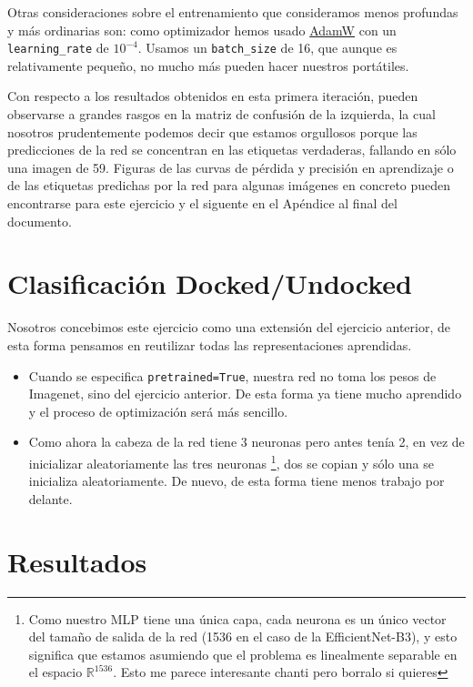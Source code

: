 \documentclass{article}
\begin{document}
Otras consideraciones sobre el entrenamiento que consideramos menos profundas y más ordinarias son: como optimizador hemos usado \href{https://arxiv.org/pdf/1711.05101}{AdamW} con un \texttt{learning\_rate} de $10^{-4}$. Usamos un \texttt{batch\_size} de 16, que aunque es relativamente pequeño, no mucho más pueden hacer nuestros portátiles. 

Con respecto a los resultados obtenidos en esta primera iteración, pueden observarse a grandes rasgos en la matriz de confusión de la izquierda, la cual nosotros prudentemente podemos decir que estamos orgullosos porque las predicciones de la red se concentran en las etiquetas verdaderas, fallando en sólo una imagen de 59. Figuras de las curvas de pérdida y precisión en aprendizaje o de las etiquetas predichas por la red para algunas imágenes en concreto pueden encontrarse para este ejercicio y el siguente en el Apéndice al final del documento.


\section*{Clasificación Docked/Undocked}

Nosotros concebimos este ejercicio como una extensión del ejercicio anterior, de esta forma pensamos en reutilizar todas las representaciones aprendidas.
\begin{itemize}
	\item Cuando se especifica \texttt{pretrained=True}, nuestra red no toma los pesos de Imagenet, sino del ejercicio anterior. De esta forma ya tiene mucho aprendido y el proceso de optimización será más sencillo.
	\item Como ahora la cabeza de la red tiene 3 neuronas pero antes tenía 2, en vez de inicializar aleatoriamente las tres neuronas \footnote{Como nuestro MLP tiene una única capa, cada neurona es un único vector del tamaño de salida de la red (1536 en el caso de la EfficientNet-B3), y esto significa que estamos asumiendo que el problema es linealmente separable en el espacio $\mathbb{R}^{1536}$. Esto me parece interesante chanti pero borralo si quieres}, dos se copian y sólo una se inicializa aleatoriamente. De nuevo, de esta forma tiene menos trabajo por delante.
\end{itemize}

\section*{Resultados}
\end{document}
